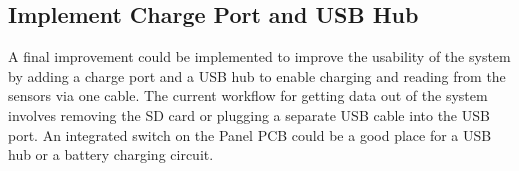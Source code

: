\subsection{Implement Charge Port and USB Hub}
A final improvement could be implemented to improve the usability of the system by adding a charge port and a USB hub to enable charging and reading from the sensors via one cable.  The current workflow for getting data out of the system involves removing the SD card or plugging a separate USB cable into the USB port.  An integrated switch on the Panel PCB could be a good place for a USB hub or a battery charging circuit.